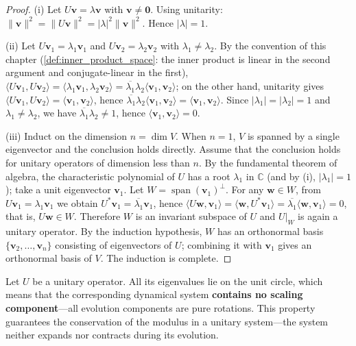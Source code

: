 \begin{proof}
(i) Let $U\mathbf{v} = \lambda \mathbf{v}$ with $\mathbf{v} \neq \mathbf{0}$. Using unitarity: $\|\mathbf{v}\|^2 = \|U\mathbf{v}\|^2 = |\lambda|^2 \|\mathbf{v}\|^2$. Hence $|\lambda| = 1$.

(ii) Let $U\mathbf{v}_1 = \lambda_1 \mathbf{v}_1$ and $U\mathbf{v}_2 = \lambda_2 \mathbf{v}_2$ with $\lambda_1 \neq \lambda_2$. By the convention of this chapter (\cref{def:inner_product_space}: the inner product is linear in the second argument and conjugate-linear in the first), $\langle U\mathbf{v}_1, U\mathbf{v}_2 \rangle = \langle \lambda_1 \mathbf{v}_1, \lambda_2 \mathbf{v}_2 \rangle = \overline{\lambda_1} \lambda_2 \langle \mathbf{v}_1, \mathbf{v}_2 \rangle$; on the other hand, unitarity gives $\langle U\mathbf{v}_1, U\mathbf{v}_2 \rangle = \langle \mathbf{v}_1, \mathbf{v}_2 \rangle$, hence $\overline{\lambda_1} \lambda_2 \langle \mathbf{v}_1, \mathbf{v}_2 \rangle = \langle \mathbf{v}_1, \mathbf{v}_2 \rangle$. Since $|\lambda_1| = |\lambda_2| = 1$ and $\lambda_1 \neq \lambda_2$, we have $\overline{\lambda_1} \lambda_2 \neq 1$, hence $\langle \mathbf{v}_1, \mathbf{v}_2 \rangle = 0$.

(iii) Induct on the dimension $n = \dim V$. When $n=1$, $V$ is spanned by a single eigenvector and the conclusion holds directly. Assume that the conclusion holds for unitary operators of dimension less than $n$. By the fundamental theorem of algebra, the characteristic polynomial of $U$ has a root $\lambda_1$ in $\mathbb{C}$ (and by (i), $|\lambda_1| = 1$); take a unit eigenvector $\mathbf{v}_1$. Let $W = \operatorname{span}(\mathbf{v}_1)^\perp$. For any $\mathbf{w} \in W$, from $U\mathbf{v}_1 = \lambda_1\mathbf{v}_1$ we obtain $U^*\mathbf{v}_1 = \overline{\lambda_1}\mathbf{v}_1$, hence $\langle U\mathbf{w}, \mathbf{v}_1 \rangle = \langle \mathbf{w}, U^*\mathbf{v}_1 \rangle = \overline{\lambda_1}\langle \mathbf{w}, \mathbf{v}_1 \rangle = 0$, that is, $U\mathbf{w} \in W$. Therefore $W$ is an invariant subspace of $U$ and $U|_W$ is again a unitary operator. By the induction hypothesis, $W$ has an orthonormal basis $\{\mathbf{v}_2, \dots, \mathbf{v}_n\}$ consisting of eigenvectors of $U$; combining it with $\mathbf{v}_1$ gives an orthonormal basis of $V$. The induction is complete.
\end{proof}

\begin{corollary}\label{cor:unitary_conservation}
Let $U$ be a unitary operator. All its eigenvalues lie on the unit circle, which means that the corresponding dynamical system \textbf{contains no scaling component}---all evolution components are pure rotations. This property guarantees the conservation of the modulus in a unitary system---the system neither expands nor contracts during its evolution.
\end{corollary}

